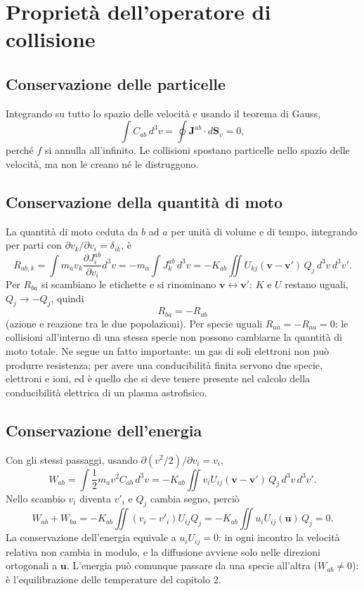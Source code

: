 \section{Proprietà dell'operatore di collisione}

\subsection{Conservazione delle particelle}
Integrando su tutto lo spazio delle velocità e usando il teorema di Gauss,
\begin{equation}
\int C_{ab}\,d^3v=\oint\mathbf{J}^{ab}\cdot d\mathbf{S}_v=0,
\end{equation}
perché $f$ si annulla all'infinito. Le collisioni spostano particelle nello spazio delle velocità, ma non le creano né le distruggono.

\subsection{Conservazione della quantità di moto}
La quantità di moto ceduta da $b$ ad $a$ per unità di volume e di tempo, integrando per parti con $\partial v_k/\partial v_i=\delta_{ik}$, è
\begin{equation}
R_{ab,k}=\int m_av_k\frac{\partial J^{ab}_i}{\partial v_i}d^3v=-m_a\int J^{ab}_k\,d^3v=-K_{ab}\iint U_{kj}(\mathbf{v}-\mathbf{v}')\,Q_j\,d^3v\,d^3v'.
\end{equation}
Per $R_{ba}$ si scambiano le etichette e si rinominano $\mathbf{v}\leftrightarrow\mathbf{v}'$: $K$ e $U$ restano uguali, $Q_j\to-Q_j$, quindi
\begin{equation}
R_{ba}=-R_{ab}
\end{equation}
(azione e reazione tra le due popolazioni). Per specie uguali $R_{aa}=-R_{aa}=0$: le collisioni all'interno di una stessa specie non possono cambiarne la quantità di moto totale. Ne segue un fatto importante: un gas di soli elettroni non può produrre resistenza; per avere una conducibilità finita servono due specie, elettroni e ioni, ed è quello che si deve tenere presente nel calcolo della conducibilità elettrica di un plasma astrofisico.

\subsection{Conservazione dell'energia}
Con gli stessi passaggi, usando $\partial(v^2/2)/\partial v_i=v_i$,
\begin{equation}
W_{ab}=\int\frac12m_av^2C_{ab}\,d^3v=-K_{ab}\iint v_iU_{ij}(\mathbf{v}-\mathbf{v}')\,Q_j\,d^3v\,d^3v'.
\end{equation}
Nello scambio $v_i$ diventa $v'_i$ e $Q_j$ cambia segno, perciò
\begin{equation}
W_{ab}+W_{ba}=-K_{ab}\iint(v_i-v'_i)U_{ij}Q_j=-K_{ab}\iint u_iU_{ij}(\mathbf{u})\,Q_j=0 .
\end{equation}
La conservazione dell'energia equivale a $u_iU_{ij}=0$: in ogni incontro la velocità relativa non cambia in modulo, e la diffusione avviene solo nelle direzioni ortogonali a $\mathbf{u}$. L'energia può comunque passare da una specie all'altra ($W_{ab}\neq0$): è l'equilibrazione delle temperature del capitolo 2.

